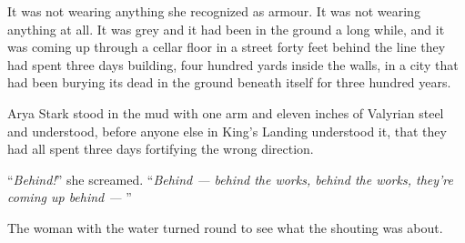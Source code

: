 It was not wearing anything she recognized as armour. It was not wearing anything at all. It was grey and it had been in the ground a long while, and it was coming up through a cellar floor in a street forty feet behind the line they had spent three days building, four hundred yards inside the walls, in a city that had been burying its dead in the ground beneath itself for three hundred years.

Arya Stark stood in the mud with one arm and eleven inches of Valyrian steel and understood, before anyone else in King’s Landing understood it, that they had all spent three days fortifying the wrong direction.

“\textit{Behind!}” she screamed. “\textit{Behind — behind the works, behind the works, they’re coming up behind — }”

The woman with the water turned round to see what the shouting was about.
